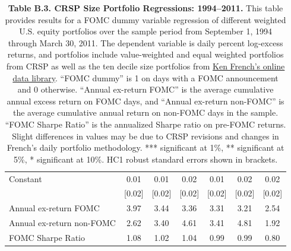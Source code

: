 \documentclass[landscape]{article}
\begin{document}
\begin{table}[htbp]
\begin{threeparttable}
\begin{tabular}{lcccccc}
Constant 
& 0.01 & 0.01 & 0.02 & 0.01 & 0.02 & 0.02 \\

{} & [0.02] & [0.02] & [0.02] & [0.02] & [0.02] & [0.02] \\

\midrule

Annual ex-return FOMC 
& 3.97 & 3.44 & 3.36 & 3.31 & 3.21 & 2.54 \\

Annual ex-return non-FOMC 
& 2.62 & 3.40 & 4.61 & 3.41 & 4.81 & 1.92 \\

FOMC Sharpe Ratio 
& 1.08 & 1.02 & 1.04 & 0.99 & 0.99 & 0.80 \\


\bottomrule
\end{tabular}


\caption*{
\textbf{Table B.3. CRSP Size Portfolio Regressions: 1994--2011.}
This table provides results for a FOMC dummy variable regression of different weighted %
U.S. equity portfolios over the sample period from September 1, 1994 through March 30, 2011. %
The dependent variable is daily percent log-excess returns, and portfolios include %
value-weighted and equal weighted portfolios from CRSP as well as the ten decile size %
portfolios from \href{https://mba.tuck.dartmouth.edu/pages/faculty/ken.french/data_library.html}{Ken French's online data library}. %
``FOMC dummy'' is 1 on days with a FOMC announcement and 0 otherwise. ``Annual ex-return FOMC'' %
is the average cumulative annual excess return on FOMC days, and ``Annual ex-return non-FOMC'' %
is the average cumulative annual return on non-FOMC days in the sample. ``FOMC Sharpe Ratio'' %
is the annualized Sharpe ratio on pre-FOMC returns. Slight differences in values may be due to %
CRSP revisions and changes in French’s daily portfolio methodology. *** significant at 1\%, %
** significant at 5\%, * significant at 10\%. HC1 robust standard errors shown in brackets.
}

\end{threeparttable}
\end{table}
\end{document}
